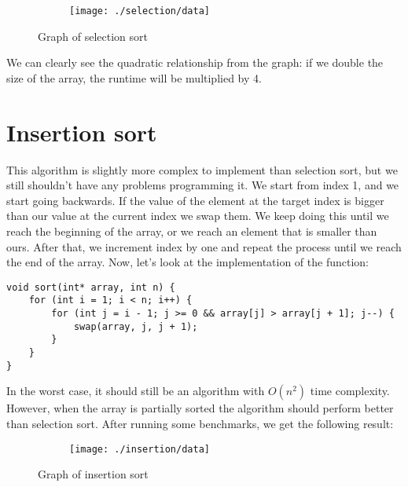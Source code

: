 \documentclass[a4paper,11pt]{article}
\begin{document}
    \begin{figure}[h]
        \centering
        \begin{subfigure}[b]{.5\textwidth}
            \centering
            \texttt{[image: ./selection/data]} %
        \end{subfigure}
        \caption{Graph of selection sort}
        \label{fig:graph_1}
    \end{figure}

    We can clearly see the quadratic relationship from the graph: if we double the size of the array, the runtime will be multiplied by 4.

    \section*{Insertion sort}

    This algorithm is slightly more complex to implement than selection sort, but we still shouldn't have any problems programming it.
    We start from index 1, and we start going backwards.
    If the value of the element at the target index is bigger than our value at the current index we swap them.
    We keep doing this until we reach the beginning of the array, or we reach an element that is smaller than ours.
    After that, we increment index by one and repeat the process until we reach the end of the array.
    Now, let's look at the implementation of the function:

    \begin{verbatim}
void sort(int* array, int n) {
    for (int i = 1; i < n; i++) {
        for (int j = i - 1; j >= 0 && array[j] > array[j + 1]; j--) {
            swap(array, j, j + 1);
        }
    }
}
    \end{verbatim}
    In the worst case, it should still be an algorithm with $O(n^2)$ time complexity.
    However, when the array is partially sorted the algorithm should perform better than selection sort.
    After running some benchmarks, we get the following result:

    \begin{figure}[h]
        \centering
        \begin{subfigure}[b]{.5\textwidth}
            \centering
            \texttt{[image: ./insertion/data]} %
        \end{subfigure}
        \caption{Graph of insertion sort}
        \label{fig:graph_2}
    \end{figure}
\end{document}
